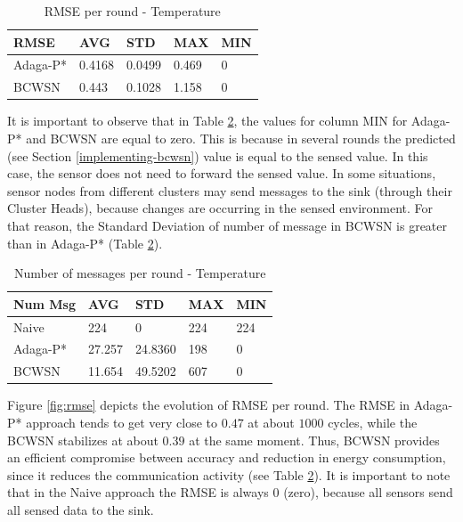 \documentclass{acm_proc_article-sp}
\begin{document}
\begin{table}[h!]
\small
\caption{RMSE per round - Temperature}
\label{tab:rmse}
\begin{center}
\begin{tabular}{|l||l|l|l|l|}
\hline
RMSE &AVG &STD &MAX &MIN \\
\hline\hline
Adaga-P* &0.4168 &0.0499 &0.469 &0 \\
\hline
BCWSN &0.443 &0.1028 &1.158 &0 \\
\hline
\end{tabular}
\end{center}
\end{table}
\vspace*{-.3cm}

It is important to observe that in Table \ref{tab:num-msg}, the values for
column MIN for Adaga-P* and BCWSN are equal to zero. This is because in several
rounds the predicted (see Section \ref{implementing-bcwsn}) value is equal to
the sensed value. In this case, the sensor does not need to forward the sensed
value. In some situations, sensor nodes from different clusters may send 
messages to the sink (through their Cluster Heads), because changes are
occurring in the sensed environment. For that reason, the Standard Deviation of
number of message in BCWSN is greater than in Adaga-P* (Table
\ref{tab:num-msg}).
\vspace*{-.3cm}

\begin{table}[h!]
\small
\caption{Number of messages per round - Temperature}
\label{tab:num-msg}
\begin{center}
\begin{tabular}{|l||l|l|l|l|}
\hline
Num Msg &AVG &STD &MAX &MIN \\
\hline\hline
Naive &224 &0 &224 &224 \\
\hline
Adaga-P* &27.257 &24.8360 &198 &0 \\
\hline
BCWSN &11.654 &49.5202 &607 &0 \\
\hline
\end{tabular}
\end{center}
\end{table}
\vspace*{-.3cm}

Figure \ref{fig:rmse} depicts the evolution of RMSE per round. The RMSE in 
Adaga-P* approach tends to get very close to $0.47$ at about $1000$ cycles,
while the BCWSN stabilizes at about $0.39$ at the same moment. Thus, BCWSN
provides an efficient compromise between accuracy and reduction in energy
consumption, since it reduces the communication activity (see Table
\ref{tab:num-msg}). It is important to note that in the Naive approach the RMSE
is always 0 (zero), because all sensors send all sensed data to the sink.
\vspace*{-.3cm}
\end{document}
